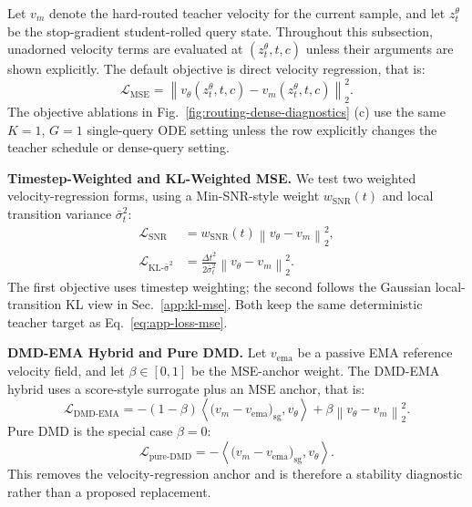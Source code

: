 Let $v_m$ denote the hard-routed teacher velocity for the current sample, and let $z_t^\theta$ be the stop-gradient student-rolled query state. Throughout this subsection, unadorned velocity terms are evaluated at $(z_t^\theta,t,c)$ unless their arguments are shown explicitly. The default objective is direct velocity regression, that is:
\begin{equation}
  \mathcal{L}_{\mathrm{MSE}}
  = \left\|v_\theta(z_t^\theta,t,c)-v_m(z_t^\theta,t,c)\right\|_2^2.
  \label{eq:app-loss-mse}
\end{equation}
The objective ablations in Fig.~\ref{fig:routing-dense-diagnostics} (c) use the same $K{=}1$, $G{=}1$ single-query ODE setting unless the row explicitly changes the teacher schedule or dense-query setting.

\noindent\textbf{Timestep-Weighted and KL-Weighted MSE.}
We test two weighted velocity-regression forms, using a Min-SNR-style weight $w_{\mathrm{SNR}}(t)$ and local transition variance $\bar{\sigma}_t^2$:
\begin{align}
  \mathcal{L}_{\mathrm{SNR}}
  &= w_{\mathrm{SNR}}(t)
  \left\|v_\theta-v_m\right\|_2^2,\\
  \mathcal{L}_{\mathrm{KL\text{-}\bar{\sigma}^2}}
  &= \frac{\Delta t^2}{2\bar{\sigma}_t^2}
  \left\|v_\theta-v_m\right\|_2^2.
  \label{eq:app-loss-weighted-mse}
\end{align}
The first objective uses timestep weighting; the second follows the Gaussian local-transition KL view in Sec.~\ref{app:kl-mse}. Both keep the same deterministic teacher target as Eq.~\eqref{eq:app-loss-mse}.

\noindent\textbf{DMD-EMA Hybrid and Pure DMD.}
Let $v_{\mathrm{ema}}$ be a passive EMA reference velocity field, and let $\beta\in[0,1]$ be the MSE-anchor weight. The DMD-EMA hybrid uses a score-style surrogate plus an MSE anchor, that is:
\begin{equation}
  \mathcal{L}_{\mathrm{DMD\text{-}EMA}}
  =-(1-\beta)\left\langle \bigl(v_m-v_{\mathrm{ema}}\bigr)_{\mathrm{sg}},v_\theta\right\rangle
  +\beta\left\|v_\theta-v_m\right\|_2^2.
  \label{eq:app-loss-dmd-ema}
\end{equation}
Pure DMD is the special case $\beta=0$:
\begin{equation}
  \mathcal{L}_{\mathrm{pure\text{-}DMD}}
  =-\left\langle \bigl(v_m-v_{\mathrm{ema}}\bigr)_{\mathrm{sg}},v_\theta\right\rangle.
  \label{eq:app-loss-pure-dmd}
\end{equation}
This removes the velocity-regression anchor and is therefore a stability diagnostic rather than a proposed replacement.

